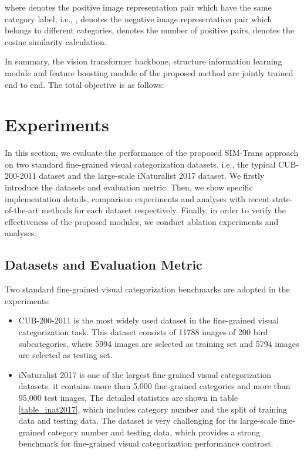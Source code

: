 \documentclass[sigconf, nonacm]{acmart}
\begin{document}
where  denotes the positive image representation pair which have the same category label, i.e., ,  denotes the negative image representation pair which belongs to different categories,  denotes the number of positive pairs,  denotes the cosine similarity calculation.

In summary, the vision transformer backbone, structure information learning module and feature boosting module of the proposed method are jointly trained end to end. The total objective is as follows:



\section{Experiments} \label{exper}






In this section, we evaluate the performance of the proposed SIM-Trans approach on two standard fine-grained visual categorization datasets, i.e., the typical CUB-200-2011 \cite{cub200} dataset and the large-scale iNaturalist 2017 \cite{van2018inaturalist} dataset. We firstly introduce the datasets and evaluation metric. Then, we show specific implementation details, comparison experiments and analyses with recent state-of-the-art methods for each dataset respectively. Finally, in order to verify the effectiveness of the proposed modules, we conduct ablation experiments and analyses.



\subsection{Datasets and Evaluation Metric}
\label{Datasets and Evaluation Metric}




Two standard fine-grained visual categorization benchmarks are adopted in the experiments: 
\begin{itemize}[leftmargin=30pt]
\item {CUB-200-2011 \cite{cub200} is the most widely used dataset in the fine-grained visual categorization task. This dataset consists of 11788 images of 200 bird subcategories, where 5994 images are selected as training set and 5794 images are selected as testing set.} 
\item {iNaturalist 2017 \cite{van2018inaturalist} is one of the largest fine-grained visual categorization datasets. it contains more than 5,000 fine-grained categories and more than 95,000 test images. The detailed statistics are shown in table \ref{table_inat2017}, which includes category number and the split of training data and testing data. The dataset is very challenging for its large-scale fine-grained category number and testing data, which provides a strong benchmark for fine-grained visual categorization performance contrast.
}
\end{itemize}
\end{document}
